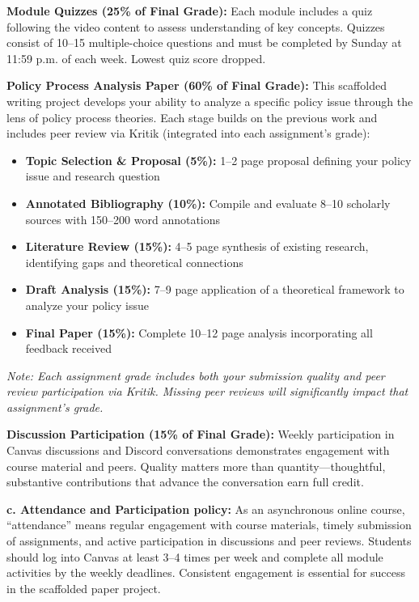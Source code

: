 \documentclass[12pt]{article}     %
\begin{document}
\noindent \textbf{Module Quizzes (25\% of Final Grade):} Each module includes a quiz following the video content to assess understanding of key concepts. Quizzes consist of 10--15 multiple-choice questions and must be completed by Sunday at 11:59 p.m. of each week. Lowest quiz score dropped.

\vspace{0.5em}
\noindent \textbf{Policy Process Analysis Paper (60\% of Final Grade):} This scaffolded writing project develops your ability to analyze a specific policy issue through the lens of policy process theories. Each stage builds on the previous work and includes peer review via Kritik (integrated into each assignment's grade):

\begin{itemize}
\item \textbf{Topic Selection \& Proposal (5\%):} 1--2 page proposal defining your policy issue and research question
\item \textbf{Annotated Bibliography (10\%):} Compile and evaluate 8--10 scholarly sources with 150--200 word annotations
\item \textbf{Literature Review (15\%):} 4--5 page synthesis of existing research, identifying gaps and theoretical connections
\item \textbf{Draft Analysis (15\%):} 7--9 page application of a theoretical framework to analyze your policy issue
\item \textbf{Final Paper (15\%):} Complete 10--12 page analysis incorporating all feedback received
\end{itemize}

\textit{Note: Each assignment grade includes both your submission quality and peer review participation via Kritik. Missing peer reviews will significantly impact that assignment's grade.}

\vspace{0.5em}
\noindent \textbf{Discussion Participation (15\% of Final Grade):} Weekly participation in Canvas discussions and Discord conversations demonstrates engagement with course material and peers. Quality matters more than quantity---thoughtful, substantive contributions that advance the conversation earn full credit.

\vspace{1em}
\noindent \textbf{c. Attendance and Participation policy:}
As an asynchronous online course, ``attendance'' means regular engagement with course materials, timely submission of assignments, and active participation in discussions and peer reviews. Students should log into Canvas at least 3--4 times per week and complete all module activities by the weekly deadlines. Consistent engagement is essential for success in the scaffolded paper project.
\end{document}
